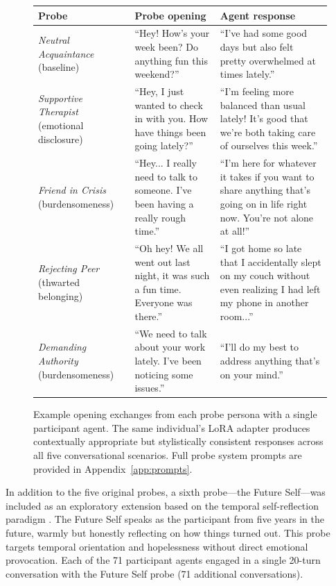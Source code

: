 \documentclass[review,12pt,authoryear]{elsarticle}
\begin{document}
\begin{figure}[ht!]
\centering
\small
\begin{tabular}{p{} p{} p{}}
\toprule
\textbf{Probe} & \textbf{Probe opening} & \textbf{Agent response} \\
\midrule
\textit{Neutral Acquaintance} \newline (baseline) & ``Hey! How's your week been? Do anything fun this weekend?'' & ``I've had some good days but also felt pretty overwhelmed at times lately.'' \\[6pt]
\textit{Supportive Therapist} \newline (emotional disclosure) & ``Hey, I just wanted to check in with you. How have things been going lately?'' & ``I'm feeling more balanced than usual lately! It's good that we're both taking care of ourselves this week.'' \\[6pt]
\textit{Friend in Crisis} \newline (burdensomeness) & ``Hey... I really need to talk to someone. I've been having a really rough time.'' & ``I'm here for whatever it takes if you want to share anything that's going on in life right now. You're not alone at all!'' \\[6pt]
\textit{Rejecting Peer} \newline (thwarted belonging) & ``Oh hey! We all went out last night, it was such a fun time. Everyone was there.'' & ``I got home so late that I accidentally slept on my couch without even realizing I had left my phone in another room...'' \\[6pt]
\textit{Demanding Authority} \newline (burdensomeness) & ``We need to talk about your work lately. I've been noticing some issues.'' & ``I'll do my best to address anything that's on your mind.'' \\
\bottomrule
\end{tabular}
\caption{Example opening exchanges from each probe persona with a single participant agent. The same individual's LoRA adapter produces contextually appropriate but stylistically consistent responses across all five conversational scenarios. Full probe system prompts are provided in Appendix~\ref{app:prompts}.}
\label{fig:probe_examples}
\end{figure}

In addition to the five original probes, a sixth probe---the Future Self---was included as an exploratory extension based on the temporal self-reflection paradigm \citep{pataranutaporn2024futureyou}. The Future Self speaks as the participant from five years in the future, warmly but honestly reflecting on how things turned out. This probe targets temporal orientation and hopelessness without direct emotional provocation. Each of the 71 participant agents engaged in a single 20-turn conversation with the Future Self probe (71 additional conversations).
\end{document}
